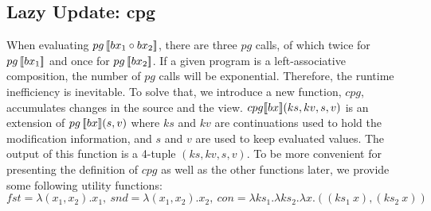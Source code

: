 \subsection{Lazy Update: cpg}

When evaluating $pg \, [\![bx_1 \circ bx_2]\!]$, there are three $pg$ calls, of which twice for $pg \, [\![bx_1]\!]$ and once for $pg \, [\![bx_2]\!]$. If a given program is a left-associative composition, the number of $pg$ calls will be exponential. Therefore, the runtime inefficiency is inevitable. To solve that, we introduce a new function, $cpg$, accumulates changes in the source and the view. $cpg [\![bx]\!] (ks, kv, s, v)$ is an extension of $pg \, [\![bx]\!] (s, v)$ where $ks$ and $kv$ are continuations used to hold the modification information, and $s$ and $v$ are used to keep evaluated values. The output of this function is a 4-tuple $(ks, kv, s, v)$. To be more convenient for presenting the definition of $cpg$ as well as the other functions later, we provide some following utility functions:\\ $fst = \lambda (x_1,x_2). x_1 , \ snd = \lambda (x_1,x_2). x_2 , \ con = \lambda ks_1. \lambda ks_2. \lambda x. ((ks_1 \ x),(ks_2 \ x))$

